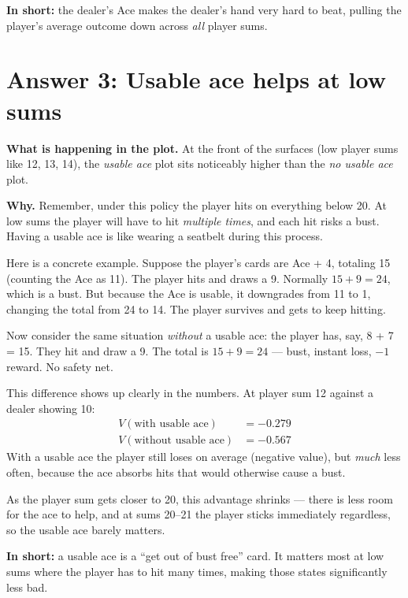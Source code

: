 \documentclass[11pt]{article}
\begin{document}
\textbf{In short:} the dealer's Ace makes the dealer's hand very hard to beat, pulling the player's average outcome down across \textit{all} player sums.

\section*{Answer 3: Usable ace helps at low sums}

\textbf{What is happening in the plot.} At the front of the surfaces (low player sums like 12, 13, 14), the \textit{usable ace} plot sits noticeably higher than the \textit{no usable ace} plot.

\textbf{Why.} Remember, under this policy the player hits on everything below 20. At low sums the player will have to hit \textit{multiple times}, and each hit risks a bust. Having a usable ace is like wearing a seatbelt during this process.

Here is a concrete example. Suppose the player's cards are Ace + 4, totaling 15 (counting the Ace as 11). The player hits and draws a 9. Normally $15 + 9 = 24$, which is a bust. But because the Ace is usable, it downgrades from 11 to 1, changing the total from 24 to 14. The player survives and gets to keep hitting.

Now consider the same situation \textit{without} a usable ace: the player has, say, 8 + 7 = 15. They hit and draw a 9. The total is $15 + 9 = 24$ --- bust, instant loss, $-1$ reward. No safety net.

This difference shows up clearly in the numbers. At player sum 12 against a dealer showing 10:
\begin{align}
    V(\text{with usable ace}) &= -0.279 \\[2pt]
    V(\text{without usable ace}) &= -0.567
\end{align}
With a usable ace the player still loses on average (negative value), but \textit{much} less often, because the ace absorbs hits that would otherwise cause a bust.

As the player sum gets closer to 20, this advantage shrinks --- there is less room for the ace to help, and at sums 20--21 the player sticks immediately regardless, so the usable ace barely matters.

\textbf{In short:} a usable ace is a ``get out of bust free'' card. It matters most at low sums where the player has to hit many times, making those states significantly less bad.
\end{document}
